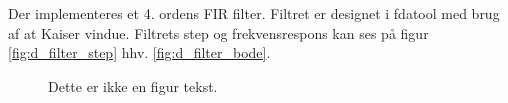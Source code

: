 Der implementeres et 4. ordens FIR filter. Filtret er designet i fdatool med brug af at Kaiser vindue. Filtrets step og frekvensrespons kan ses på figur \ref{fig:d_filter_step} hhv. \ref{fig:d_filter_bode}. 

\begin{figure}[h!]
\centering
{}
\caption[D-filterets respons]{Dette er ikke en figur tekst. }
\label{fig:d_filter}
\end{figure}







